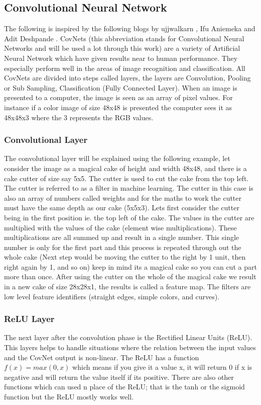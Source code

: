 \documentclass[12pt, a4paper,oneside]{report}
\begin{document}
\subsection{Convolutional Neural Network}
The following is inspired by the following blogs by ujjwalkarn \cite{cnnonline}, Ifu Aniemeka\cite{AFriendl79} and Adit Deshpande \cite{convo:online}.
CovNets (this abbreviation stands for Convolutional Neural Networks and will be used a lot through this work) are a variety of Artificial Neural Network which have given results near to human performance. They  especially perform well in the areas of image recognition and classification. All CovNets are divided into steps called layers, the layers are Convolution, Pooling or Sub Sampling, Classification (Fully Connected Layer). When an image is presented to a computer, the image is seen as an array of pixel values. For instance if a  color image of size 48x48 is presented the computer sees it as 48x48x3 where the 3 represents the RGB values. 

\subsubsection{Convolutional Layer}
The convolutional layer will be explained using the following example, let consider the image as a magical cake of height and width 48x48, and there is a cake cutter of size say 5x5. The cutter is used to cut the cake from the top left. The cutter is referred to as a filter in machine learning. The cutter in this case is also an array of numbers called weights and for the maths to work the cutter must have the same depth as our cake (5x5x3).
Lets first consider the cutter being in the first position ie. the top left of the cake. The values in the cutter are multiplied with the values of the cake (element wise multiplications). These multiplications are all summed up and result in a single number. This single number is only for the first part and this process is repeated through out the whole cake (Next step would be moving the cutter to the right by 1 unit, then right again by 1, and so on) keep in mind its a magical cake so you can cut a part more than once. After using the cutter on the whole of the magical cake we result in a new cake of size 28x28x1, the results is called a feature map. The filters are low level feature identifiers (straight edges, simple colors, and curves). 


\subsubsection{ReLU Layer}
The next layer after the convolution phase is the Rectified Linear Units (ReLU). This layers helps to handle situations where the relation between the input values and the CovNet output is non-linear. The ReLU has a function \(f(x) = max(0,x)\) which means if you give it a value x, it will return 0 if x is negative and will return the value itself if its positive. There are also other functions which can used n place of the ReLU; that is the tanh or the sigmoid function but the ReLU mostly works well.
\end{document}
